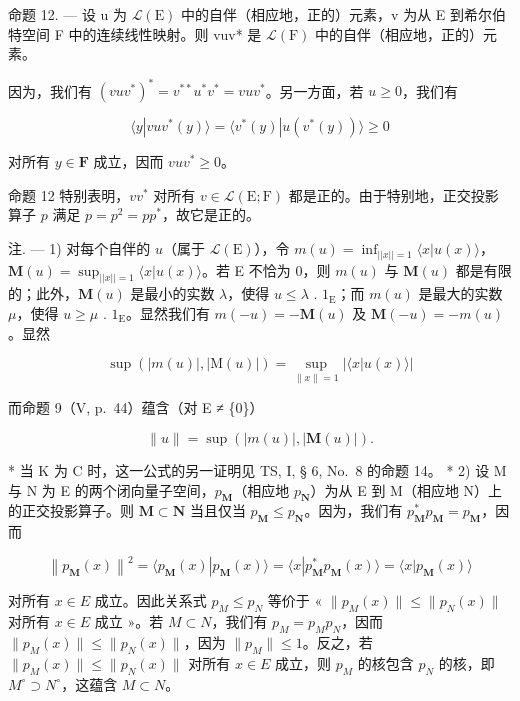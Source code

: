 命题 12. --- 设 u 为 \(\mathcal{L}(\mathrm{E})\) 中的自伴（相应地，正的）元素，v 为从 E 到希尔伯特空间 F 中的连续线性映射。则 vuv* 是 \(\mathcal{L}(\mathrm{F})\) 中的自伴（相应地，正的）元素。

因为，我们有 \((vuv^{*})^{*} = v^{**}u^{*}v^{*} = vuv^{*}\)。另一方面，若 \(u \geqslant 0\)，我们有

\[
\langle y | v u v ^ {*} (y) \rangle = \langle v ^ {*} (y) | u (v ^ {*} (y)) \rangle \geqslant 0
\]

对所有 \(y \in \mathbf{F}\) 成立，因而 \(vuv^{*} \geqslant 0\)。

命题 12 特别表明，\(vv^*\) 对所有 \(v \in \mathcal{L}(\mathrm{E};\mathrm{F})\) 都是正的。由于特别地，正交投影算子 \(p\) 满足 \(p = p^2 = pp^*\)，故它是正的。

注. --- 1) 对每个自伴的 \(u\)（属于 \(\mathcal{L}(\mathrm{E})\)），令 \(m(u) = \inf_{||x|| = 1} \langle x|u(x) \rangle\)，\(\mathbf{M}(u) = \sup_{||x|| = 1} \langle x|u(x) \rangle\)。若 E 不恰为 0，则 \(m(u)\) 与 \(\mathbf{M}(u)\) 都是有限的；此外，\(\mathbf{M}(u)\) 是最小的实数 \(\lambda\)，使得 \(u \leqslant \lambda\) . \(1_{\mathrm{E}}\)；而 \(m(u)\) 是最大的实数 \(\mu\)，使得 \(u \geqslant \mu\) . \(1_{\mathrm{E}}\)。显然我们有 \(m(-u) = -\mathbf{M}(u)\) 及 \(\mathbf{M}(-u) = -m(u)\)。显然

\[
\sup \left(| m (u) |, | \mathrm{M} (u) |\right) = \sup _ {\| x \| = 1} \left| \langle x | u (x) \rangle \right|
\]

而命题 9（V, p.~44）蕴含（对 E ≠ \{0\}）

\[
\| u \| = \sup \left(| m (u) |, | \mathbf {M} (u) |\right).\tag{17}
\]

* 当 K 为 C 时，这一公式的另一证明见 TS, I, § 6, No.~8 的命题 14。 * 2) 设 M 与 N 为 E 的两个闭向量子空间，\(p_{\mathbf{M}}\)（相应地 \(p_{\mathbf{N}}\)）为从 E 到 M（相应地 N）上的正交投影算子。则 \(\mathbf{M} \subset \mathbf{N}\) 当且仅当 \(p_{\mathbf{M}} \leqslant p_{\mathbf{N}}\)。因为，我们有 \(p_{\mathbf{M}}^{*}p_{\mathbf{M}} = p_{\mathbf{M}}\)，因而

\[
\left\| p _ {\mathbf {M}} (x) \right\| ^ {2} = \langle p _ {\mathbf {M}} (x) | p _ {\mathbf {M}} (x) \rangle = \langle x | p _ {\mathbf {M}} ^ {*} p _ {\mathbf {M}} (x) \rangle = \langle x | p _ {\mathbf {M}} (x) \rangle
\]

对所有 \(x \in E\) 成立。因此关系式 \(p_{M} \leqslant p_{N}\) 等价于 « \(\|p_{M}(x)\| \leqslant \|p_{N}(x)\|\) 对所有 \(x \in E\) 成立 »。若 \(M \subset N\)，我们有 \(p_{M} = p_{M} p_{N}\)，因而 \(\|p_{M}(x)\| \leqslant \|p_{N}(x)\|\)，因为 \(\|p_{M}\| \leqslant 1\)。反之，若 \(\|p_{M}(x)\| \leqslant \|p_{N}(x)\|\) 对所有 \(x \in E\) 成立，则 \(p_{M}\) 的核包含 \(p_{N}\) 的核，即 \(M^{\circ} \supset N^{\circ}\)，这蕴含 \(M \subset N\)。

